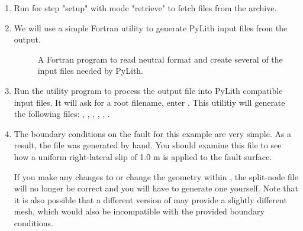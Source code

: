 \begin{enumerate}
\item Run  for step "setup" with mode "retrieve" to
  fetch files from the archive.

  \begin{screen}
    \shellprompt{}
  \end{screen}
  
\item We will use a simple Fortran utility to generate PyLith
  input files from the  output.

  \begin{description}
  \item[] A Fortran program to read
     neutral format and create several of the
    input files needed by PyLith.
  \end{description}
  
\item Run the  utility program to process the
   output file into PyLith compatible input files.
  It will ask for a root filename, enter . This
  utilitiy will generate the following files:
  , ,
  , ,
  , .

  \begin{screen}
    \shellprompt{}
  \end{screen}
  
\item The boundary conditions on the fault for this example are
  very simple. As a result, the  file was
  generated by hand. You should examine this file to see how a uniform
  right-lateral slip of 1.0 m is applied to the fault surface.

  \begin{warning}
    If you make any changes to  or change the
    geometry within , the split-node file
     will no longer be correct and you will
    have to generate one yourself.  Note that it is also possible that
    a different version of  may provide a slightly
    different mesh, which would also be incompatible with the provided
    boundary conditions.
  \end{warning}
  

\end{enumerate}

